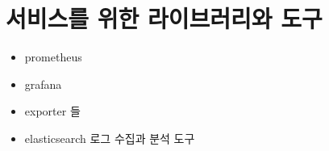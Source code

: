 \chapter{서비스를 위한 라이브러리와 도구}

\begin{itemize}
    \item prometheus 
    \item grafana 
    \item exporter 들
    \item elasticsearch 로그 수집과 분석 도구
\end{itemize}

